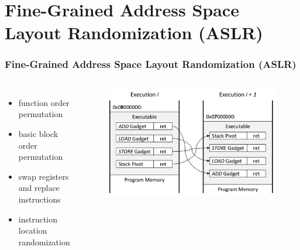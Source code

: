 \documentclass[aspectratio=169]{beamer}
\begin{document}

\section{Fine-Grained Address Space Layout Randomization (ASLR)}
\begin{frame}
\frametitle{Fine-Grained Address Space Layout Randomization (ASLR)}
\begin{columns}[c]
\begin{itemize}
\item function order permutation
\item basic block order permutation
\item swap registers and replace instructions
\item instruction location randomization
\end{itemize}
\begin{figure}
\includegraphics[width=1.0\linewidth]{figures/faslr.pdf}
\end{figure}
\end{columns}
\end{frame}

\end{document}

